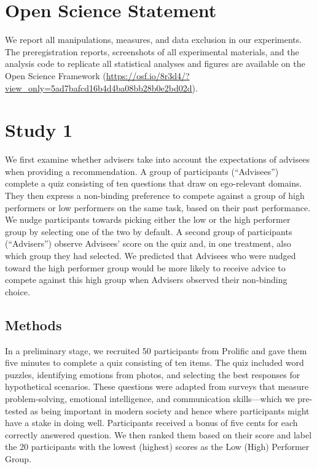 \documentclass[
  man,
  floatsintext,
  longtable,
  nolmodern,
  notxfonts,
  notimes,
  colorlinks=true,linkcolor=blue,citecolor=blue,urlcolor=blue]{apa7}
\begin{document}
\section{Open Science Statement}\label{open-science-statement}

We report all manipulations, measures, and data exclusion in our
experiments. The preregistration reports, screenshots of all
experimental materials, and the analysis code to replicate all
statistical analyses and figures are available on the Open Science
Framework
(\url{https://osf.io/8r3d4/?view_only=5ad7bafcd16b4d4ba08bb28b0e2bd02d}).

\section{Study 1}\label{study-1}

We first examine whether advisers take into account the expectations of
advisees when providing a recommendation. A group of participants
(``Advisees'') complete a quiz consisting of ten questions that draw on
ego-relevant domains. They then express a non-binding preference to
compete against a group of high performers or low performers on the same
task, based on their past performance. We nudge participants towards
picking either the low or the high performer group by selecting one of
the two by default. A second group of participants (``Advisers'')
observe Advisees' score on the quiz and, in one treatment, also which
group they had selected. We predicted that Advisees who were nudged
toward the high performer group would be more likely to receive advice
to compete against this high group when Advisers observed their
non-binding choice.

\subsection{Methods}\label{methods}

In a preliminary stage, we recruited 50 participants from Prolific and
gave them five minutes to complete a quiz consisting of ten items. The
quiz included word puzzles, identifying emotions from photos, and
selecting the best responses for hypothetical scenarios. These questions
were adapted from surveys that measure problem-solving, emotional
intelligence, and communication skills---which we pre-tested as being
important in modern society and hence where participants might have a
stake in doing well. Participants received a bonus of five cents for
each correctly answered question. We then ranked them based on their
score and label the 20 participants with the lowest (highest) scores as
the Low (High) Performer Group.
\end{document}
